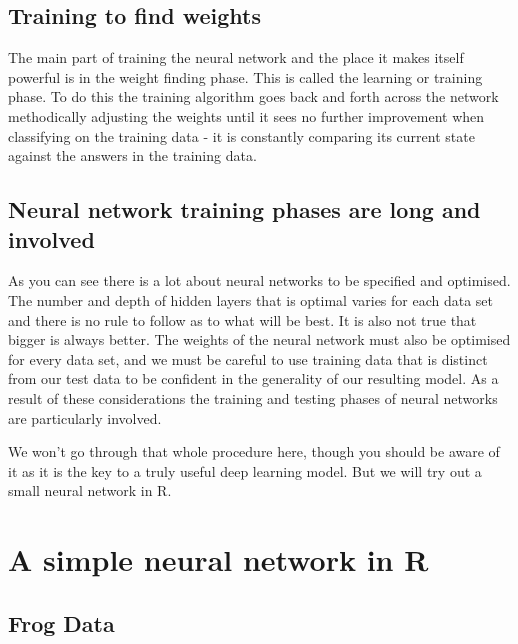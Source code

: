 \documentclass[
]{book}
\begin{document}
\hypertarget{training-to-find-weights}{%
\subsection{Training to find weights}\label{training-to-find-weights}}

The main part of training the neural network and the place it makes itself powerful is in the weight finding phase. This is called the learning or training phase. To do this the training algorithm goes back and forth across the network methodically adjusting the weights until it sees no further improvement when classifying on the training data - it is constantly comparing its current state against the answers in the training data.

\hypertarget{neural-network-training-phases-are-long-and-involved}{%
\subsection{Neural network training phases are long and involved}\label{neural-network-training-phases-are-long-and-involved}}

As you can see there is a lot about neural networks to be specified and optimised. The number and depth of hidden layers that is optimal varies for each data set and there is no rule to follow as to what will be best. It is also not true that bigger is always better. The weights of the neural network must also be optimised for every data set, and we must be careful to use training data that is distinct from our test data to be confident in the generality of our resulting model. As a result of these considerations the training and testing phases of neural networks are particularly involved.

We won't go through that whole procedure here, though you should be aware of it as it is the key to a truly useful deep learning model. But we will try out a small neural network in R.

\hypertarget{a-simple-neural-network-in-r}{%
\section{A simple neural network in R}\label{a-simple-neural-network-in-r}}

\hypertarget{frog-data}{%
\subsection{Frog Data}\label{frog-data}}
\end{document}

